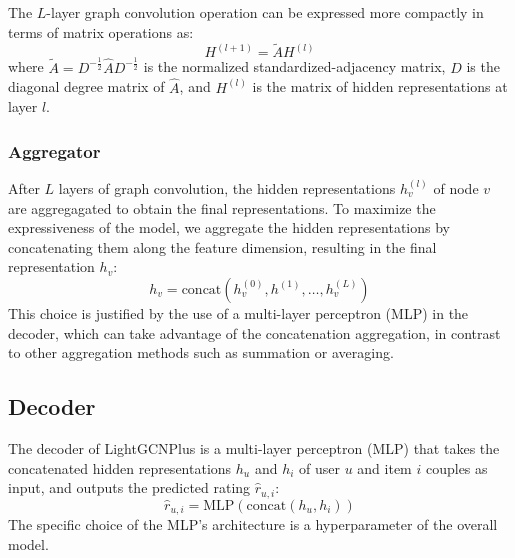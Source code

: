 \documentclass[10pt,conference,compsocconf]{IEEEtran}
\begin{document}
The $L$-layer graph convolution operation can be expressed more compactly in terms of matrix operations as:
\begin{equation}
    H^{(l+1)} = \tilde{A} H^{(l)}
\end{equation}
where $\tilde{A} = D^{-\frac{1}{2}} \hat{A} D^{-\frac{1}{2}}$ is the normalized standardized-adjacency matrix, $D$ is the diagonal degree matrix of $\hat{A}$, and $H^{(l)}$ is the matrix of hidden representations at layer $l$.
\subsubsection{Aggregator}
After $L$ layers of graph convolution, the hidden representations $h_v^{(l)}$ of node $v$ are aggregagated to obtain the final representations.
To maximize the expressiveness of the model, we aggregate the hidden representations by concatenating them along the feature dimension, 
resulting in the final representation $h_v$:
\begin{equation}
    h_v = \text{concat}(h_v^{(0)}, h^{(1)}, \ldots, h_v^{(L)})
\end{equation}
This choice is justified by the use of a multi-layer perceptron (MLP) in the decoder, which can take advantage of the concatenation aggregation, in contrast to other aggregation methods such as summation or averaging.

\subsection{Decoder}
The decoder of LightGCNPlus is a multi-layer perceptron (MLP) that takes the concatenated hidden representations $h_u$ and $h_i$ of user $u$ and item $i$ couples as input, and outputs the predicted rating $\hat{r}_{u,i}$:
\begin{equation}
    \hat{r}_{u,i} = \text{MLP}(\text{concat}(h_u, h_i))
\end{equation}
The specific choice of the MLP's architecture is a hyperparameter of the overall model.
\end{document}
